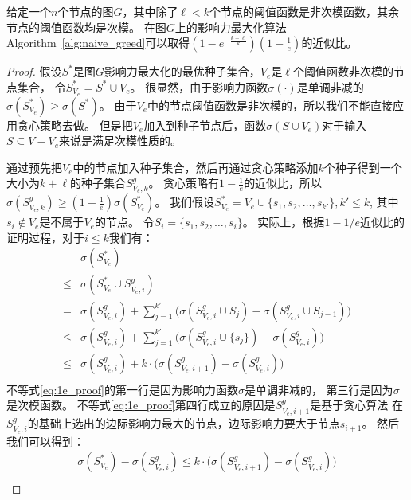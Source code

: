 \begin{theorem}\label{the:naive_greedy}
给定一个$n$个节点的图$G$，其中除了$\ell < k$个节点的阈值函数是非次模函数，其余节点的阈值函数均是次模。
在图$G$上的影响力最大化算法Algorithm~\ref{alg:naive_greed}可以取得$(1-e^{-\frac{k-\ell}{k}})(1-\frac{1}{e})$的近似比。
\end{theorem}
\begin{proof}
假设$S^*$是图$G$影响力最大化的最优种子集合，$V_e$是$\ell$个阈值函数非次模的节点集合，
令$S^*_{V_e} = S^* \cup V_e$。
很显然，由于影响力函数$\sigma(\cdot)$是单调非减的$\sigma(S^*_{V_e}) \geq \sigma(S^*)$。
由于$V_e$中的节点阈值函数是非次模的，所以我们不能直接应用贪心策略去做。
但是把$V_e$加入到种子节点后，函数$\sigma(S\cup V_e)$对于输入$S \subseteq V-V_e$来说是满足次模性质的。

通过预先把$V_e$中的节点加入种子集合，然后再通过贪心策略添加$k$个种子得到一个大小为$k+\ell$的种子集合$S^g_{V_e,k}$。
贪心策略有$1-\frac{1}{e}$的近似比，所以$\sigma(S^g_{V_e,k}) \geq (1-\frac{1}{e})\sigma(S^*_{V_e})$。
我们假设$S^*_{V_e}=V_e \cup \{s_1,s_2,\dots,s_{k'}\}, k'\leq k$, 其中$s_i \not\in V_e$是不属于$V_e$的节点。
令$S_i = \{s_1,s_2,\dots,s_i\}$。
实际上，根据$1-1/e$近似比的证明过程，对于$i\leq k$我们有：
\begin{equation}
\label{eq:1e_proof}
\begin{array}{ll}
&\sigma(S^*_{V_e})\\
\leq & \sigma(S^*_{V_e} \cup S^g_{V_e,i})\\
= & \sigma(S^g_{V_e,i}) +
	\sum_{j=1}^{k'} \big( \sigma(S^g_{V_e,i} \cup S_j) - 	
	\sigma(S^g_{V_e,i} \cup S_{j-1})\big)\\
\leq & \sigma(S^g_{V_e,i}) +
	\sum_{j=1}^{k'} \big( \sigma(S^g_{V_e,i} \cup \{s_j\}) - 	
	\sigma(S^g_{V_e,i})\big)\\
\leq & \sigma(S^g_{V_e,i}) +
	k\cdot \big( \sigma(S^g_{V_e,i+1})-\sigma(S^g_{V_e,i})\big)\\
\end{array}
\end{equation}
不等式\ref{eq:1e_proof}的第一行是因为影响力函数$\sigma$是单调非减的，
第三行是因为$\sigma$是次模函数。
不等式\ref{eq:1e_proof}第四行成立的原因是$S^g_{V_e,i+1}$是基于贪心算法
在$S^g_{V_e,i}$的基础上选出的边际影响力最大的节点，边际影响力要大于节点$s_{i+1}$。
然后我们可以得到：
\begin{equation*}
\label{eq:sub_greedy_re}
\begin{array}{ll}
\sigma(S^*_{V_e}) - \sigma(S^g_{V_e,i}) \leq
k\cdot \big( \sigma(S^g_{V_e,i+1})-\sigma(S^g_{V_e,i})\big) \\

\end{array}
\end{equation*}
\end{proof}
